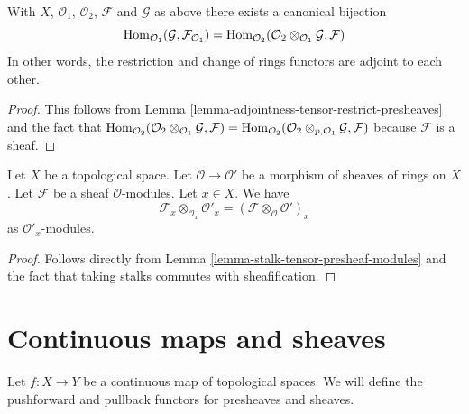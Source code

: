 \begin{lemma}
\label{lemma-adjointness-tensor-restrict}
With $X$, $\mathcal{O}_1$, $\mathcal{O}_2$, $\mathcal{F}$ and
$\mathcal{G}$ as above there exists a canonical bijection
$$
\mathop{\mathrm{Hom}}\nolimits_{\mathcal{O}_1}(\mathcal{G}, \mathcal{F}_{\mathcal{O}_1})
=
\mathop{\mathrm{Hom}}\nolimits_{\mathcal{O}_2}(
\mathcal{O}_2 \otimes_{\mathcal{O}_1} \mathcal{G},
\mathcal{F}
)
$$
In other words, the restriction and change of rings functors
are adjoint to each other.
\end{lemma}

\begin{proof}
This follows from
Lemma \ref{lemma-adjointness-tensor-restrict-presheaves}
and the fact that
$\mathop{\mathrm{Hom}}\nolimits_{\mathcal{O}_2}(
\mathcal{O}_2 \otimes_{\mathcal{O}_1} \mathcal{G},
\mathcal{F}
)
=
\mathop{\mathrm{Hom}}\nolimits_{\mathcal{O}_2}(
\mathcal{O}_2 \otimes_{p, \mathcal{O}_1} \mathcal{G},
\mathcal{F}
)$
because $\mathcal{F}$ is a sheaf.
\end{proof}

\begin{lemma}
\label{lemma-stalk-tensor-sheaf-modules}
Let $X$ be a topological space.
Let $\mathcal{O} \to \mathcal{O}'$ be a morphism of
sheaves of rings on $X$.
Let $\mathcal{F}$ be a sheaf $\mathcal{O}$-modules.
Let $x \in X$. We have
$$
\mathcal{F}_x \otimes_{\mathcal{O}_x} \mathcal{O}'_x
=
(\mathcal{F} \otimes_\mathcal{O} \mathcal{O}')_x
$$
as $\mathcal{O}'_x$-modules.
\end{lemma}

\begin{proof}
Follows directly from Lemma \ref{lemma-stalk-tensor-presheaf-modules}
and the fact that taking stalks commutes with sheafification.
\end{proof}


















\section{Continuous maps and sheaves}
\label{section-presheaves-functorial}

\noindent
Let $f : X \to Y$ be a continuous map of topological spaces.
We will define the pushforward and pullback functors for
presheaves and sheaves.

